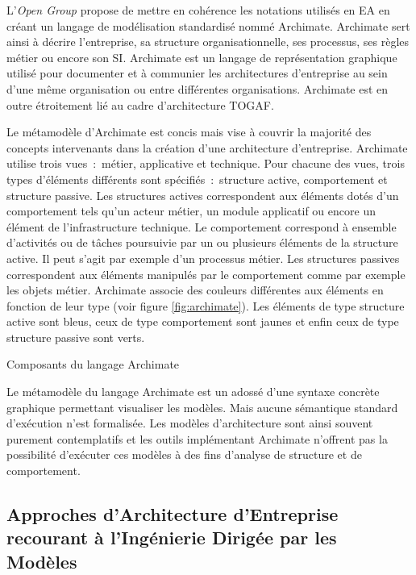 L'\textit{Open Group} propose de mettre en cohérence les notations utilisés en EA en créant un langage de modélisation standardisé nommé Archimate. Archimate sert ainsi à décrire l'entreprise, sa structure organisationnelle, ses processus, ses règles métier ou encore son SI. Archimate est un langage de représentation graphique utilisé pour documenter et à communier les architectures d'entreprise au sein d'une même organisation ou entre différentes organisations. Archimate est en outre étroitement lié au cadre d'architecture TOGAF. 

Le métamodèle d'Archimate est concis mais vise à couvrir la majorité des concepts intervenants dans la création d'une architecture d'entreprise. Archimate utilise trois vues~:~métier, applicative et technique. Pour chacune des vues, trois types d'éléments différents sont spécifiés~:~structure active, comportement et structure passive. Les structures actives correspondent aux éléments dotés d'un comportement tels qu'un acteur métier, un module applicatif ou encore un élément de l'infrastructure technique. Le comportement correspond à ensemble d'activités ou de tâches poursuivie par un ou plusieurs éléments de la structure active. Il peut s'agit par exemple d'un processus métier. Les structures passives correspondent aux éléments manipulés par le comportement comme par exemple les objets métier. Archimate associe des couleurs différentes aux éléments en fonction de leur type (voir figure \ref{fig:archimate}). Les éléments de type structure active sont bleus, ceux de type comportement sont jaunes et enfin ceux de type structure passive sont verts. 

\begin{table}[!ht]
    \vspace*{0.5em}
    \begin{center}
        
    \end{center}
 \caption{Composants du langage Archimate}
 \label{fig:archimate}
\end{table}

Le métamodèle du langage Archimate est un adossé d'une syntaxe concrète graphique permettant visualiser les modèles. Mais aucune sémantique standard d'exécution n'est formalisée. Les modèles d'architecture sont ainsi souvent purement contemplatifs et les outils implémentant Archimate n'offrent pas la possibilité d'exécuter ces modèles à des fins d'analyse de structure et de comportement. 

\subsection{Approches d'Architecture d'Entreprise recourant à l'Ingénierie Dirigée par les Modèles}

